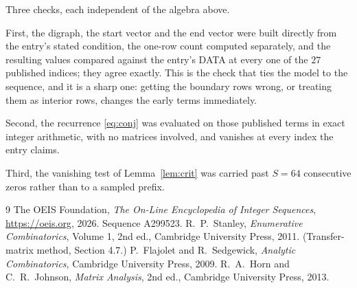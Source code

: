 \documentclass[11pt,a4paper]{article}
\theoremstyle{plain}
\theoremstyle{definition}
\begin{document}
Three checks, each independent of the algebra above.

First, the digraph, the start vector and the end vector were built directly from the
entry's stated condition, the one-row count computed separately, and the resulting values
compared against the entry's DATA at every one of the $27$ published indices; they
agree exactly. This is the check that ties the model to the sequence, and it is a sharp one:
getting the boundary rows wrong, or treating them as interior rows, changes the early terms
immediately.

Second, the recurrence \eqref{eq:conj} was evaluated on those published terms in exact
integer arithmetic, with no matrices involved, and vanishes at every index the entry claims.

Third, the vanishing test of Lemma~\ref{lem:crit} was carried past $S=64$ consecutive
zeros rather than to a sampled prefix.

\begin{thebibliography}{9}
 The OEIS Foundation, \emph{The On-Line Encyclopedia of Integer
Sequences}, \url{https://oeis.org}, 2026. Sequence A299523.
 R.~P.~Stanley, \emph{Enumerative Combinatorics}, Volume 1, 2nd ed.,
Cambridge University Press, 2011. (Transfer-matrix method, Section 4.7.)
 P.~Flajolet and R.~Sedgewick, \emph{Analytic Combinatorics}, Cambridge
University Press, 2009.
 R.~A.~Horn and C.~R.~Johnson, \emph{Matrix Analysis}, 2nd ed., Cambridge
University Press, 2013.
\end{thebibliography}
\end{document}

